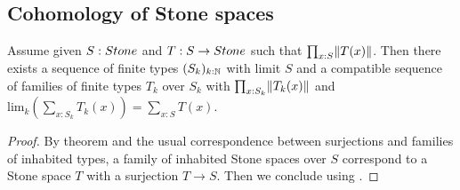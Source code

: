 \subsection{Cohomology of Stone spaces}

%
%
%
\begin{lemma}\label{finite-approximation-surjection-stone}
Assume given $S:\Stone$ and $T:S\to\Stone$ such that $\prod_{x:S}\lVert T(x) \rVert$.
Then there exists a sequence of finite types $(S_k)_{k:\mathbb{N}}$ with limit $S$ 
and a compatible sequence of families of finite types $T_k$ over $S_k$
with $\prod_{x:S_k}\lVert T_k(x) \rVert$ and 
$\mathrm{lim}_k\left(\sum_{x:S_k}T_k(x)\right) = \sum_{x:S}T(x)$. 
%
\end{lemma}

\begin{proof}
By theorem  and the usual correspondence between surjections and families of inhabited types, a family of inhabited Stone spaces over $S$ correspond to a Stone space $T$ with a surjection $T\to S$. Then we conclude using .
\end{proof}

